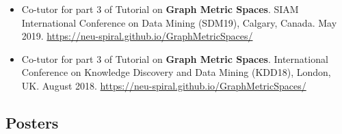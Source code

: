 \documentclass[12pt,]{scrartcl}
\newenvironment{myitemize}
{ \begin{itemize}
    \setlength{\itemsep}{5pt}
    \setlength{\parskip}{0pt}
    \setlength{\parsep}{0pt}     }
{ \end{itemize}                  }
\begin{document}
\begin{myitemize}
\leftskip-0.25in

\item Co-tutor for part 3 of Tutorial on \textbf{Graph Metric Spaces}. SIAM International Conference on Data Mining (SDM19), Calgary, Canada. May 2019. \url{https://neu-spiral.github.io/GraphMetricSpaces/}

\item Co-tutor for part 3 of Tutorial on \textbf{Graph Metric Spaces}. International Conference on Knowledge Discovery and Data Mining (KDD18), London, UK. August 2018. \url{https://neu-spiral.github.io/GraphMetricSpaces/}

\end{myitemize}


\subsection{Posters}\label{posters}
\end{document}
